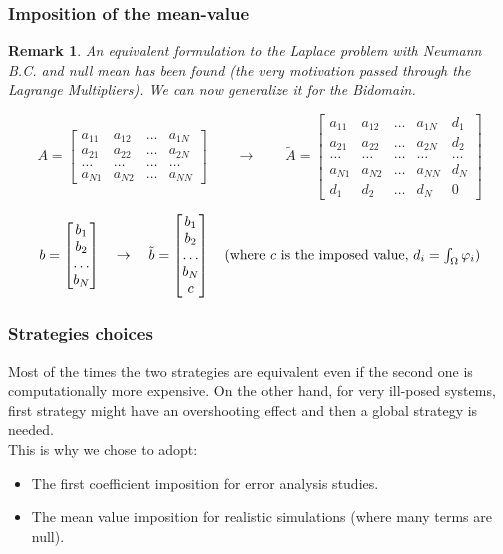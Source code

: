 \documentclass[9pt]{beamer}
\newtheorem*{remark}{Remark}
\begin{document}
\begin{frame}
\frametitle{Imposition of the mean-value}
\begin{remark}
	An equivalent formulation to the Laplace problem with Neumann B.C. and null mean has been found (the very motivation passed through the Lagrange Multipliers). We can now generalize it for the Bidomain.
\end{remark}
\begin{equation*}
A=\begin{bmatrix}
a_{11} & a_{12} & \dots & a_{1N} \\ 
a_{21} & a_{22} & \dots & a_{2N} \\ 
\dots & \dots & \dots & \dots \\
a_{N1}  & a_{N2} & \dots & a_{NN}
\end{bmatrix} \quad \quad \rightarrow
\quad \quad \tilde{A}=\begin{bmatrix}
a_{11} & a_{12} & \dots & a_{1N} & d_1\\ 
a_{21} & a_{22} & \dots & a_{2N} & d_2 \\ 
\dots & \dots & \dots & \dots & \dots \\
a_{N1}  & a_{N2} & \dots & a_{NN} & d_N \\
d_1 & d_2 & \dots & d_N & 0
\end{bmatrix}
\end{equation*}

\begin{equation*}
b=\begin{bmatrix}
b_1 \\ b_2 \\ \dots \\ b_N
\end{bmatrix} \quad \rightarrow \quad
\tilde{b}=\begin{bmatrix}
b_1 \\ b_2 \\ \dots \\ b_N \\ c
\end{bmatrix} \quad \text{(where $c$ is the imposed value, $ \textstyle d_i = \int_\Omega \varphi_i$)}
\end{equation*}
\end{frame}

\begin{frame}
\frametitle{Strategies choices}
Most of the times the two strategies are equivalent even if the second one is computationally more expensive. On the other hand, for very ill-posed systems, first strategy might have an overshooting effect and then a global strategy is needed. \vspace{4mm} \\
This is why we chose to adopt:
\begin{itemize}
	\item The first coefficient imposition for error analysis studies.
	\item The mean value imposition for realistic simulations (where many terms are null).
\end{itemize}
\end{frame}
\end{document}
